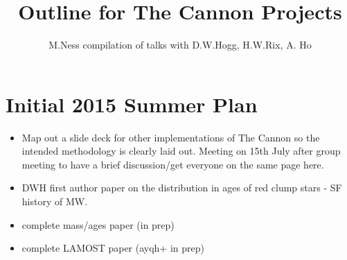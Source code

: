 \documentclass[11pt]{amsart}
\title{Outline for The Cannon Projects}
\author{M.Ness compilation of talks with D.W.Hogg, H.W.Rix, A. Ho}
\begin{document}
\maketitle

\section{Initial 2015 Summer Plan}
\begin{itemize}
\item Map out a slide deck for other implementations of The Cannon so the intended methodology is clearly laid out. Meeting on 15th July after group meeting to have a brief discussion/get everyone on the same page here.
\item DWH first author paper on  the distribution in ages of red clump stars - SF history of MW. 
\item complete mass/ages paper (in prep)
\item complete LAMOST paper (ayqh+ in prep)
\end{itemize} 
\end{document}
